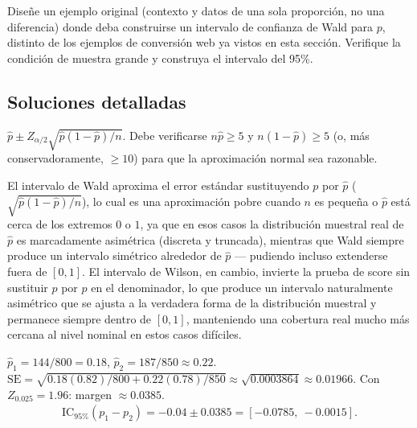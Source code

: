 \begin{problema}
	\label{prob:e10df82}
	Diseñe un ejemplo original (contexto y datos de una sola proporción, no una diferencia) donde deba construirse un intervalo de confianza de Wald para $p$, distinto de los ejemplos de conversión web ya vistos en esta sección. Verifique la condición de muestra grande y construya el intervalo del 95\%.
\end{problema}

\subsection*{Soluciones detalladas}

\begin{solproblema}
	$\hat p \pm Z_{\alpha/2}\sqrt{\hat p(1-\hat p)/n}$. Debe verificarse $n\hat p\ge5$ y $n(1-\hat p)\ge5$ (o, más conservadoramente, $\ge10$) para que la aproximación normal sea razonable.
\end{solproblema}

\begin{solproblema}[prob:8394415]
	El intervalo de Wald aproxima el error estándar sustituyendo $p$ por $\hat p$ ($\sqrt{\hat p(1-\hat p)/n}$), lo cual es una aproximación pobre cuando $n$ es pequeña o $\hat p$ está cerca de los extremos $0$ o $1$, ya que en esos casos la distribución muestral real de $\hat p$ es marcadamente asimétrica (discreta y truncada), mientras que Wald siempre produce un intervalo simétrico alrededor de $\hat p$ — pudiendo incluso extenderse fuera de $[0,1]$. El intervalo de Wilson, en cambio, invierte la prueba de score sin sustituir $p$ por $\hat p$ en el denominador, lo que produce un intervalo naturalmente asimétrico que se ajusta a la verdadera forma de la distribución muestral y permanece siempre dentro de $[0,1]$, manteniendo una cobertura real mucho más cercana al nivel nominal en estos casos difíciles.
\end{solproblema}

\begin{solproblema}[prob:f92b151]
	$\hat p_1=144/800=0.18$, $\hat p_2=187/850\approx0.22$. $\text{SE} = \sqrt{0.18(0.82)/800+0.22(0.78)/850} \approx\sqrt{0.0003864}\approx0.01966$. Con $Z_{0.025}=1.96$: margen $\approx0.0385$.
	\begin{align*}
		\text{IC}_{95\%}(p_1-p_2) = -0.04\pm0.0385 = [-0.0785,\ -0.0015].
	\end{align*}
\end{solproblema}

